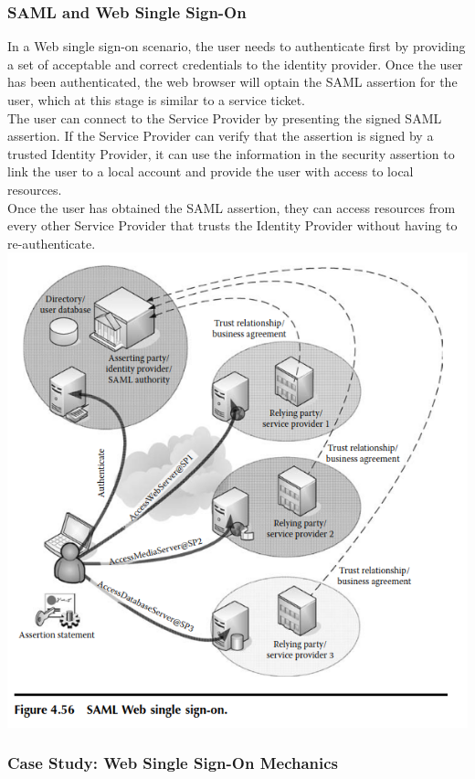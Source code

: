 \documentclass[12pt,a4paper]{univention}
\begin{document}
\subsubsection{SAML and Web Single Sign-On}
In a Web single sign-on scenario, the user needs to authenticate first by providing a set of acceptable and correct credentials to the identity provider. Once the user has been authenticated, the web browser will optain the SAML assertion for the user, which at this stage is similar to a service ticket.\\
The user can connect to the Service Provider by presenting the signed SAML assertion. If the Service Provider can verify that the assertion is signed by a trusted Identity Provider, it can use the information in the security assertion to link the user to a local account and provide the user with access to local resources.\\
Once the user has obtained the SAML assertion, they can access resources from every other Service Provider that trusts the Identity Provider without having to re-authenticate.\\
\includegraphics[scale=0.7]{samlauth.png}\\
\subsubsection{Case Study: Web Single Sign-On Mechanics}
\end{document}
